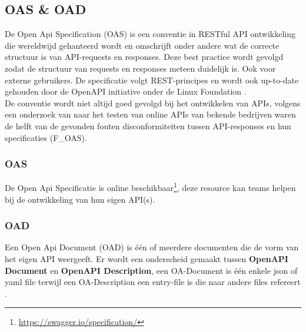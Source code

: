 \subsection{OAS \& OAD}
\label{ssec:oasandoad}

De Open Api Specification (OAS) is een conventie in RESTful API ontwikkeling die wereldwijd gehanteerd wordt en omschrijft onder andere wat de correcte structuur is van API-requests en responses. Deze best practice wordt gevolgd zodat de structuur van requests en responses meteen duidelijk is. Ook voor externe gebruikers. De specificatie volgt REST-principes en wordt ook up-to-date gehouden door de OpenAPI initiative onder de Linux Foundation \autocite{OpenAPIInitiativea}. \\

De conventie wordt niet altijd goed gevolgd bij het ontwikkelen van APIs, volgens een onderzoek van \textcite{Martin-Lopez2022} naar het testen van online APIs van bekende bedrijven waren de helft van de gevonden fouten disconformiteiten tussen API-responses en hun specificaties (F\_OAS).

\subsubsection{OAS}
\label{sssec:oas}

De Open Api Specificatie is online beschikbaar\footnote{\href{https://swagger.io/specification/}{https://swagger.io/specification/}}, deze resource kan teams helpen bij de ontwikkeling van hun eigen API(s).

\subsubsection{OAD}
\label{sssec:oad}

Een Open Api Document (OAD) is één of meerdere documenten die de vorm van het eigen API weergeeft. Er wordt een onderscheid gemaakt tussen \textbf{OpenAPI Document} en \textbf{OpenAPI Description}, een OA-Document is één enkele json of yaml file terwijl een OA-Description een entry-file is die naar andere files refereert \autocite{OpenAPIInitiative}.\\

